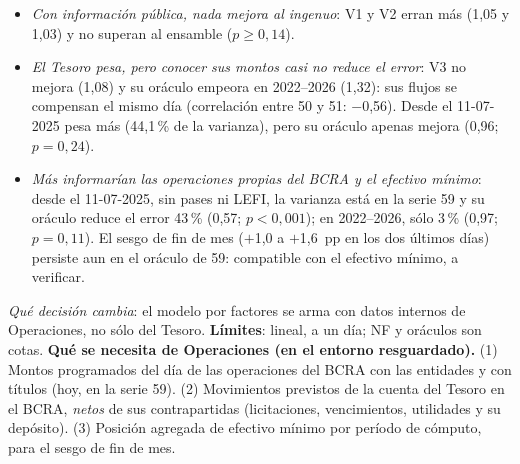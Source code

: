\begin{itemize}
\item \emph{Con información pública, nada mejora al ingenuo}: V1 y V2 erran más (1,05 y 1,03) y no superan al ensamble ($p\geq0{,}14$).
\item \emph{El Tesoro pesa, pero conocer sus montos casi no reduce el error}: V3 no mejora (1,08) y su oráculo empeora en 2022--2026 (1,32): sus flujos se compensan el mismo día (correlación entre 50 y 51: $-$0,56). Desde el 11-07-2025 pesa más (44,1\,\% de la varianza), pero su oráculo apenas mejora (0,96; $p=0{,}24$).
\item \emph{Más informarían las operaciones propias del BCRA y el efectivo mínimo}: desde el 11-07-2025, sin pases ni LEFI, la varianza está en la serie 59 y su oráculo reduce el error 43\,\% (0,57; $p<0{,}001$); en 2022--2026, sólo 3\,\% (0,97; $p=0{,}11$). El sesgo de fin de mes ($+$1,0 a $+$1,6~pp en los dos últimos días) persiste aun en el oráculo de 59: compatible con el efectivo mínimo, a verificar.
\end{itemize}
\emph{Qué decisión cambia}: el modelo por factores se arma con datos internos de Operaciones, no sólo del Tesoro. \textbf{Límites}: lineal, a un día; NF y oráculos son cotas. \textbf{Qué se necesita de Operaciones (en el entorno resguardado).} (1) Montos programados del día de las operaciones del BCRA con las entidades y con títulos (hoy, en la serie 59). (2) Movimientos previstos de la cuenta del Tesoro en el BCRA, \emph{netos} de sus contrapartidas (licitaciones, vencimientos, utilidades y su depósito). (3) Posición agregada de efectivo mínimo por período de cómputo, para el sesgo de fin de mes.

